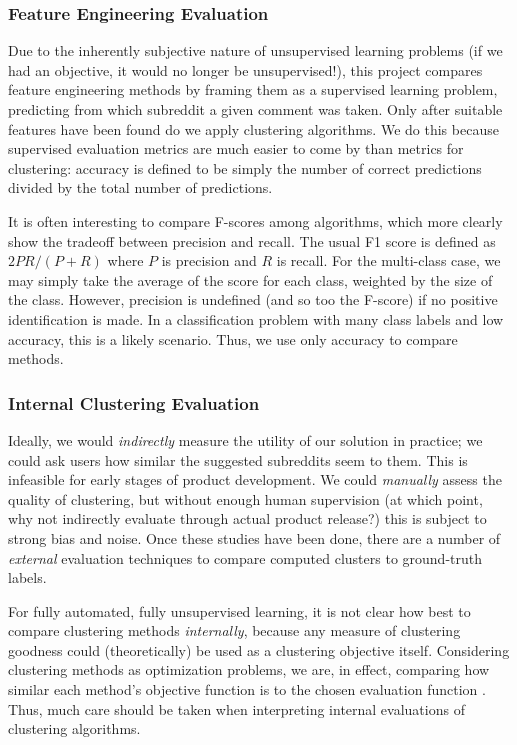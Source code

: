 \documentclass[]{article}
\begin{document}
\subsubsection{Feature Engineering Evaluation}
Due to the inherently subjective nature of unsupervised learning problems (if we had an objective, it would no longer be unsupervised!), this project compares feature engineering methods by framing them as a supervised learning problem, predicting from which subreddit a given comment was taken. Only after suitable features have been found do we apply clustering algorithms. We do this because supervised evaluation metrics are much easier to come by than metrics for clustering: accuracy is defined to be simply the number of correct predictions divided by the total number of predictions. 

It is often interesting to compare F-scores among algorithms, which more clearly show the tradeoff between precision and recall. The usual F1 score is defined as $2 P R / (P+R)$ where $P$ is precision and $R$ is recall. For the multi-class case, we may simply take the average of the score for each class, weighted by the size of the class. However, precision is undefined (and so too the F-score) if no positive identification is made. In a classification problem with many class labels and low accuracy, this is a likely scenario. Thus, we use only accuracy to compare methods.

\subsubsection{Internal Clustering Evaluation}
Ideally, we would \emph{indirectly} measure the utility of our solution in practice; we could ask users how similar the suggested subreddits seem to them. This is infeasible for early stages of product development. We could \emph{manually} assess the quality of clustering, but without enough human supervision (at which point, why not indirectly evaluate through actual product release?) this is subject to strong bias and noise. Once these studies have been done, there are a number of \emph{external} evaluation techniques to compare computed clusters to ground-truth labels.

For fully automated, fully unsupervised learning, it is not clear how best to compare clustering methods \emph{internally}, because any measure of clustering goodness could (theoretically) be used as a clustering objective itself. Considering clustering methods as optimization problems, we are, in effect, comparing how similar each method's objective function is to the chosen evaluation function \cite{Feldman-textmining}. Thus, much care should be taken when interpreting internal evaluations of clustering algorithms.
\end{document}
